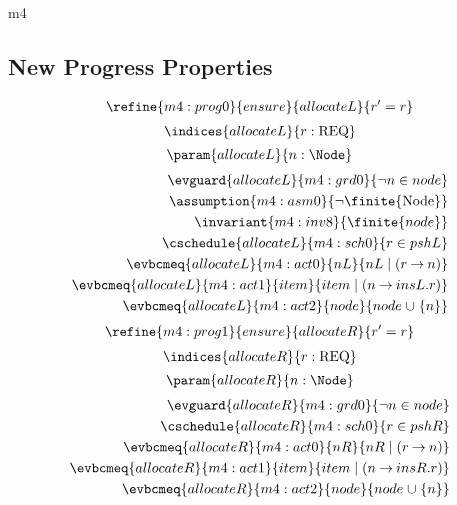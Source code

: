 \documentclass[12pt]{amsart}
\newcommand{\REQ}{\text{REQ}}
\begin{document}
\begin{machine}{m4}
\subsection{New Progress Properties}
  \begin{align*}
    \refine{m4:prog0}{ensure}{allocateL}{ \index{r}{r' = r} }
  \end{align*}
  \[ \indices{allocateL}{ r : \REQ } \]
  \[ \param{allocateL}{ n : \Node } \]
  \begin{align}
    \evguard{allocateL}{m4:grd0}{ \neg n \in node } \\
    \assumption{m4:asm0}{ \neg \finite{\Node} } \\
    \invariant{m4:inv8}{ \finite{node} } \\
    \cschedule{allocateL}{m4:sch0}{ r \in pshL } \\
    \evbcmeq{allocateL}{m4:act0}{nL}{nL \1| (r \fun n)} \\
    \evbcmeq{allocateL}{m4:act1}{item}{item \1| (n \fun insL.r)} \\
    \evbcmeq{allocateL}{m4:act2}{node}{ node \bunion \{n\}}
  \end{align}
  \begin{align*}
    \refine{m4:prog1}{ensure}{allocateR}{ \index{r}{r' = r} }
  \end{align*}
  \[ \indices{allocateR}{ r : \REQ } \]
  \[ \param{allocateR}{ n : \Node } \]
  \begin{align}
    \evguard{allocateR}{m4:grd0}{ \neg n \in node } \\
    \cschedule{allocateR}{m4:sch0}{ r \in pshR } \\
    \evbcmeq{allocateR}{m4:act0}{nR}{nR \1| (r \fun n)} \\
    \evbcmeq{allocateR}{m4:act1}{item}{item \1| (n \fun insR.r)} \\
    \evbcmeq{allocateR}{m4:act2}{node}{ node \bunion \{n\}}
  \end{align}

\end{machine}

\end{document}
